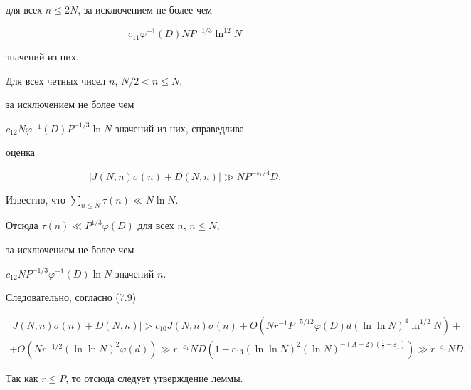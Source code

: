 для всех $n\le 2N$, за исключением не более чем


\begin{equation}


c_{11} \varphi^{-1}(D)NP^{-1/3}\ln^{12}N


\end{equation}


значений из них.





\begin{lems}


Для всех четных чисел $n$, $N/2<n\le N$, 


за исключением не более чем


$c_{12}N \varphi^{-1}(D)P^{-1/3}\ln N$ значений из них, справедлива


оценка


$$


|J(N,n)\sigma(n)+D(N,n)|\gg NP^{-\varepsilon_1/4}D.


$$  


\end{lems}





\begin{pf}


Известно, что $\sum\limits_{n\le N}\tau(n)\ll N\ln N$.


Отсюда $\tau(n)\ll P^{1/3}\varphi(D)$ для всех $n$, $n\le N$,


за исключением не более чем


$c_{12}N P^{-1/3}\varphi^{-1}(D)\ln N$ значений $n$.





Следовательно, согласно (7.9)


\begin{multline*}


|J(N,n)\sigma(n)+D(N,n)|>c_{10}J(N,n)\sigma(n)+


O(Nr^{-1}P^{-5/12}\varphi(D) d


(\ln\ln N)^4\ln^{1/2}N)+ \\


%


+O(Nr^{-1/2}(\ln\ln N)^2\varphi(d))\gg r^{-\varepsilon_1}ND


(1-c_{13}(\ln\ln N)^2(\ln N)^{-(A+2)(\frac12-\varepsilon_1)})


\gg r^{-\varepsilon_1}ND.


\end{multline*}


Так как $r\le P$, то отсюда следует утверждение леммы.


\end{pf}





